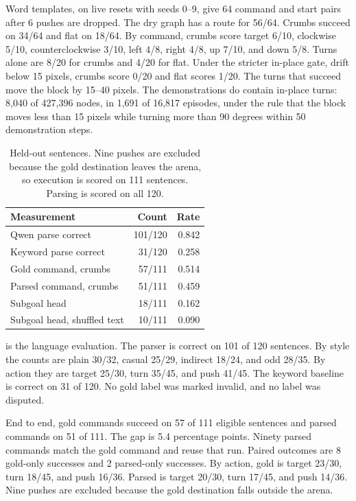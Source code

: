 \documentclass[11pt,a4paper]{article}
\begin{document}
Word templates, on live resets with seeds 0--9, give 64 command and start pairs after 6 pushes are dropped.
The dry graph has a route for 56/64.
Crumbs succeed on 34/64 and flat on 18/64.
By command, crumbs score target 6/10, clockwise 5/10, counterclockwise 3/10, left 4/8, right 4/8, up 7/10, and down 5/8.
Turns alone are 8/20 for crumbs and 4/20 for flat.
Under the stricter in-place gate, drift below 15 pixels, crumbs score 0/20 and flat scores 1/20.
The turns that succeed move the block by 15--40 pixels.
The demonstrations do contain in-place turns: 8,040 of 427,396 nodes, in 1,691 of 16,817 episodes, under the rule that the block moves less than 15 pixels while turning more than 90 degrees within 50 demonstration steps.

\begin{table}[t]
\centering
\caption{Held-out sentences. Nine pushes are excluded because the gold destination leaves the arena, so execution is scored on 111 sentences. Parsing is scored on all 120.}
\label{tab:lang}
\begin{tabular}{lrr}
\toprule
Measurement & Count & Rate \\
\midrule
Qwen parse correct & 101/120 & 0.842 \\
Keyword parse correct & 31/120 & 0.258 \\
Gold command, crumbs & 57/111 & 0.514 \\
Parsed command, crumbs & 51/111 & 0.459 \\
Subgoal head & 18/111 & 0.162 \\
Subgoal head, shuffled text & 10/111 & 0.090 \\
\bottomrule
\end{tabular}
\end{table}

 is the language evaluation.
The parser is correct on 101 of 120 sentences.
By style the counts are plain 30/32, casual 25/29, indirect 18/24, and odd 28/35.
By action they are target 25/30, turn 35/45, and push 41/45.
The keyword baseline is correct on 31 of 120.
No gold label was marked invalid, and no label was disputed.

End to end, gold commands succeed on 57 of 111 eligible sentences and parsed commands on 51 of 111.
The gap is 5.4 percentage points.
Ninety parsed commands match the gold command and reuse that run.
Paired outcomes are 8 gold-only successes and 2 parsed-only successes.
By action, gold is target 23/30, turn 18/45, and push 16/36.
Parsed is target 20/30, turn 17/45, and push 14/36.
Nine pushes are excluded because the gold destination falls outside the arena.
\end{document}
